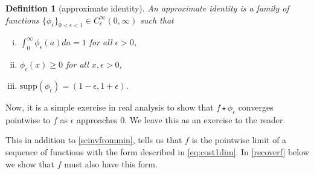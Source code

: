 \documentclass{article}
\newtheorem{claim}{Claim}
\newtheorem{definition}{Definition}
\newcommand{\e}{\epsilon}
\newcommand{\R}{\mathbb{R}}
\begin{document}
\begin{definition}[approximate identity]\label{approxid}
  An approximate identity is a family of functions
  $\{\phi_\epsilon\}_{0<\epsilon<1}\in C^\infty_c(0,\infty)$ such that
  \begin{enumerate}[(i)]
  \item $\int_0^\infty \phi_\epsilon(a) da =1$ for all $\epsilon>0$,
  \item $\phi_\epsilon(x)\geq 0$ for all $x,\epsilon>0$,
    \item $\mbox{supp}(\phi_\epsilon) = (1-\epsilon,1+\epsilon)$.
  \end{enumerate}
\end{definition}
Now, it is a simple exercise in real analysis to show that $f\star\phi_\e$
converges pointwise to $f$ as $\e$ approaches $0$. We leave this as an exercise to the reader.

This in addition to \cref{scinvfrommin}, tells us that $f$ is the
pointwise limit of a sequence of functions with the form described in
\cref{eq:cost1dim}. In
\cref{recoverf} below we show that $f$ must also have this form.
\end{document}
